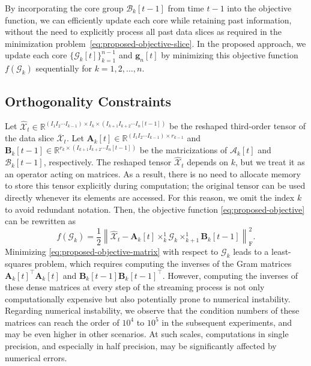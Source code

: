 \documentclass[a4paper, 11pt]{article}
\newcommand{\ttimes}[2]{\times_{#1}^{#2}}
\theoremstyle{plain}
\theoremstyle{definition}
\theoremstyle{remark}
\begin{document}
By incorporating the core group $\mathcal{B}_k[t-1]$ from time $t-1$ into the objective function, we can efficiently update each core while retaining past information, without the need to explicitly process all past data slices as required in the minimization problem~\eqref{eq:proposed-objective-slice}.
In the proposed approach, we update each core $\{\mathcal{G}_k[t]\}_{k=1}^{n-1}$ and $\bm{g}_n[t]$ by minimizing this objective function $f(\mathcal{G}_k)$ sequentially for $k = 1, 2, \ldots, n$.

\subsection{Orthogonality Constraints}
Let $\widehat{\mathcal{X}}_t \in \mathbb{R}^{(I_1 I_2 \cdots I_{k-1}) \times I_k \times (I_{k+1} I_{k+2} \cdots I_n[t-1])}$ be the reshaped third-order tensor of the data slice $\overline{\mathcal{X}}_t$.
Let $\mathbf{A}_k[t] \in \mathbb{R}^{(I_1 I_2 \cdots I_{k-1}) \times r_{k-1}}$ and $\mathbf{B}_k[t-1] \in \mathbb{R}^{r_k \times (I_{k+1} I_{k+2} \cdots I_n[t-1])}$ be the matricizations of $\mathcal{A}_k[t]$ and $\mathcal{B}_k[t-1]$, respectively.
The reshaped tensor $\widehat{\mathcal{X}}_t$ depends on $k$, but we treat it as an operator acting on matrices.
As a result, there is no need to allocate memory to store this tensor explicitly during computation; the original tensor can be used directly whenever its elements are accessed.
For this reason, we omit the index $k$ to avoid redundant notation.
Then, the objective function \eqref{eq:proposed-objective} can be rewritten as
\begin{equation}
    f(\mathcal{G}_k) = \frac{1}{2} \left\| \widehat{\mathcal{X}}_t - \mathbf{A}_k[t] \ttimes{k}{1} \mathcal{G}_k \ttimes{k+1}{1} \mathbf{B}_k[t-1] \right\|_\mathrm{F}^2. \label{eq:proposed-objective-matrix}
\end{equation}
Minimizing \eqref{eq:proposed-objective-matrix} with respect to $\mathcal{G}_k$ leads to a least-squares problem, which requires computing the inverses of the Gram matrices $\mathbf{A}_k[t]^\top \mathbf{A}_k[t]$ and $\mathbf{B}_k[t-1] \mathbf{B}_k[t-1]^\top$.
However, computing the inverses of these dense matrices at every step of the streaming process is not only computationally expensive but also potentially prone to numerical instability.
Regarding numerical instability, we observe that the condition numbers of these matrices can reach the order of $10^4$ to $10^5$ in the subsequent experiments, and may be even higher in other scenarios.
At such scales, computations in single precision, and especially in half precision, may be significantly affected by numerical errors.
\end{document}
